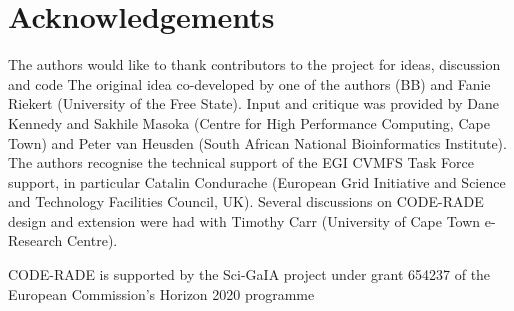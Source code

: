 \documentclass[a4paper]{jpconf}
\begin{document}
\section*{Acknowledgements}
The authors would like to thank contributors to the project for ideas, discussion and code
The original idea co-developed by one of the authors (BB) and Fanie Riekert (University of the Free
State). Input and critique was provided  by Dane Kennedy and Sakhile Masoka (Centre for High
Performance Computing, Cape Town) and Peter van Heusden (South African National Bioinformatics
Institute). The authors recognise the technical support of the EGI CVMFS Task Force support, in
particular Catalin Condurache (European Grid Initiative and Science and Technology Facilities
Council, UK). Several discussions on CODE-RADE design and extension were had with Timothy Carr
(University of Cape Town e-Research Centre).

CODE-RADE is supported by the Sci-GaIA project under grant 654237 of the European Commission's
Horizon 2020 programme
\end{document}
